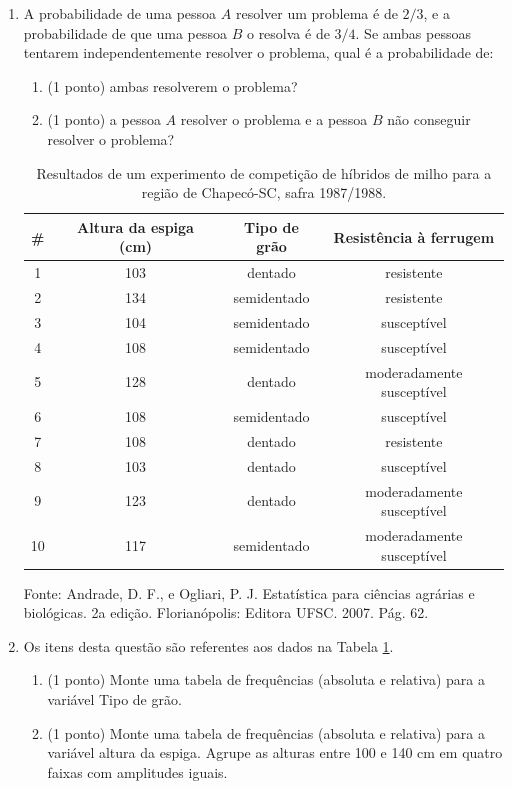\documentclass{article}
\begin{document}
\begin{enumerate}


\item A probabilidade de uma pessoa $A$ resolver um problema é de $2/3$, e a probabilidade de que uma pessoa $B$ o resolva é de $3/4$. Se ambas pessoas tentarem independentemente resolver o problema, qual é a probabilidade de:
\begin{enumerate}
	\item (1 ponto) ambas resolverem o problema?
	
	\item (1 ponto) a pessoa $A$ resolver o problema e a pessoa $B$ não conseguir resolver o problema?

\end{enumerate}


	\begin{table}[thp]
	\caption{Resultados de um experimento de competição de híbridos de milho para a região de Chapecó-SC, safra 1987/1988.}
	\label{t:milho}
	\centering
	\begin{tabular}{cccc}
		\hline
		\# & Altura da espiga (cm) & Tipo de grão & Resistência à ferrugem \\
		\hline
		1 & 103 & dentado & resistente \\
		2 & 134 & semidentado & resistente \\
		3 & 104 & semidentado & susceptível \\
		4 & 108 & semidentado & susceptível \\
		5 & 128 & dentado & moderadamente susceptível \\
		6 & 108 & semidentado & susceptível \\
		7 & 108 & dentado & resistente \\
		8 & 103 & dentado & susceptível \\
		9 & 123 & dentado & moderadamente susceptível \\
		10 & 117 & semidentado & moderadamente susceptível \\
		\hline
	\end{tabular}
\end{table}	
\vspace{-1em}
{\footnotesize Fonte: Andrade, D. F., e Ogliari, P. J. Estatística para ciências agrárias e biológicas. 2a edição. Florianópolis: Editora UFSC. 2007. Pág. 62.}\\

\item Os itens desta questão são referentes aos dados na Tabela \ref{t:milho}.
\begin{enumerate}
	\item (1 ponto) Monte uma tabela de frequências  (absoluta e relativa) para a variável Tipo de grão.
	\item (1 ponto) Monte uma tabela de frequências (absoluta e relativa) para a variável altura da espiga. Agrupe as alturas entre 100 e 140 cm em quatro faixas com amplitudes iguais.
\end{enumerate}   



\end{enumerate}
\end{document}
